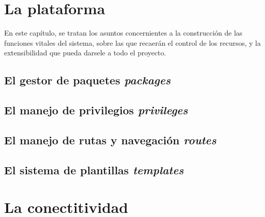 \section{La plataforma}

En este capítulo, se tratan los asuntos concernientes a la construcción de las funciones vitales del sistema, sobre las que
recaerán el control de los recursos, y la extensibilidad que pueda darsele a todo el proyecto.

\subsection{El gestor de paquetes \emph{packages}}


\subsection{El manejo de privilegios \emph{privileges}}
\subsection{El manejo de rutas y navegación \emph{routes}}

\subsection{El sistema de plantillas \emph{templates}}


\section{La conectitividad}


